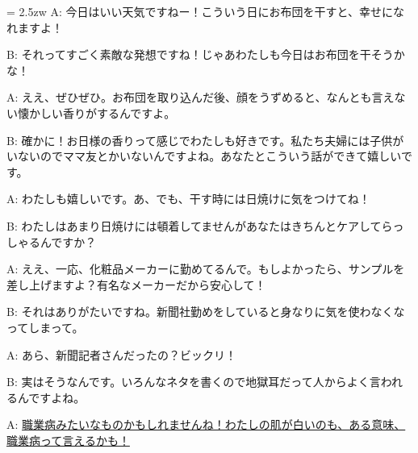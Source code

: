 \documentclass[11pt]{amsart}
\title{}
\author{}
\newenvironment{hangall}[1]{\hangindent = 2.5zw\everypar{\hangindent = 2.5zw}}{}
\begin{document}
\maketitle
\begin{hangall}{}%
A: 今日はいい天気ですねー！こういう日にお布団を干すと、幸せになれますよ！

B: それってすごく素敵な発想ですね！じゃあわたしも今日はお布団を干そうかな！

A: ええ、ぜひぜひ。お布団を取り込んだ後、顔をうずめると、なんとも言えない懐かしい香りがするんですよ。

B: 確かに！お日様の香りって感じでわたしも好きです。私たち夫婦には子供がいないのでママ友とかいないんですよね。あなたとこういう話ができて嬉しいです。

A: わたしも嬉しいです。あ、でも、干す時には日焼けに気をつけてね！

B: わたしはあまり日焼けには頓着してませんがあなたはきちんとケアしてらっしゃるんですか？

A: ええ、一応、化粧品メーカーに勤めてるんで。もしよかったら、サンプルを差し上げますよ？有名なメーカーだから安心して！

B: それはありがたいですね。新聞社勤めをしていると身なりに気を使わなくなってしまって。

A: あら、新聞記者さんだったの？ビックリ！

B: 実はそうなんです。いろんなネタを書くので地獄耳だって人からよく言われるんですよね。

A: \ul{職業病みたいなものかもしれませんね！わたしの肌が白いのも、ある意味、職業病って言えるかも！}\end{hangall}
\end{document}
